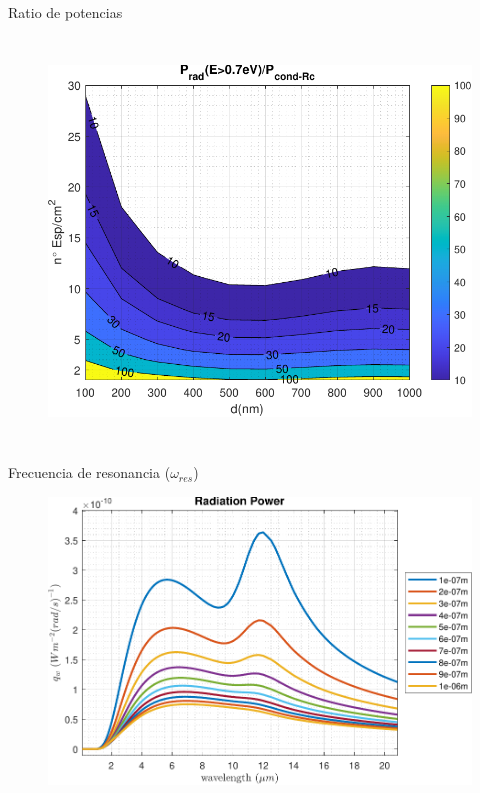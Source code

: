 \documentclass[spanish,a4paper]{beamer}%
\newcommand{\resRadPath}{\graphicspath{{./figuras/Resultados/radiacion/}}}
\begin{document}
\begin{frame}{Ratio de potencias}
\begin{columns}
\begin{figure}[h]
										\includegraphics[width=\columnwidth]{SiC_Rc}%
								\label{fig:SiCSiO2Ge_relRc}%
						\end{figure}
						\vfill
				\end{columns}		
		\end{frame}
		\begin{frame}{Frecuencia de resonancia ($\omega_{res}$)}	
			\resRadPath
		\begin{figure}[h]
			\centering
				\includegraphics[width=.8\textwidth]{SiCSiC.pdf}
			\label{fig:SiCSiC}
		\end{figure}
	\end{frame}
	
\end{document}
